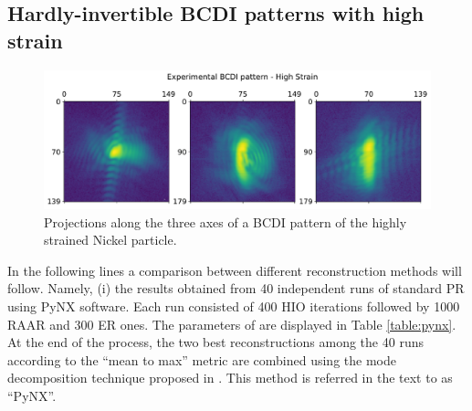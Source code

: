 \subsection{Hardly-invertible BCDI patterns with high strain}

\begin{figure}[H]
  \centering
  \includegraphics[width=\textwidth]{figures/AD/AD_exp3_michael.pdf}
  \caption{Projections along the three axes of a BCDI pattern of the highly strained Nickel particle. }
  \label{fig:projections_michael}
\end{figure}

In the following lines a comparison between different reconstruction methods will follow. Namely, (i) the results obtained 
from 40 independent runs of standard PR using PyNX software. Each run consisted of 400 HIO iterations followed by 1000 RAAR and 
300 ER ones. The parameters of are displayed in Table \ref{table:pynx}. 
At the end of the process, the two best reconstructions among the 40 runs according to the ``mean to max'' metric \cite{Frisch2023CuAgCatalysts, Grimes2024CatalystStrain} 
are combined using the mode decomposition technique proposed in \cite{favre-nicolin_free_2020}. 
This method is referred in the text to as ``PyNX''. 

